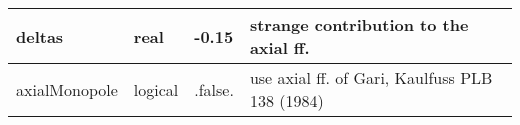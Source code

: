 \documentclass{article}
\begin{document}
\begin{longtable}{llll}
\midrule
deltas & \begin{minipage}[t]{2cm}real\end{minipage} & \begin{minipage}[t]{2cm}-0.15\end{minipage} & \begin{minipage}[t]{12cm}strange contribution to the axial ff.\end{minipage}\\*
\midrule
axialMonopole & \begin{minipage}[t]{2cm}logical\end{minipage} & \begin{minipage}[t]{2cm}.false.\end{minipage} & \begin{minipage}[t]{12cm}use axial ff. of Gari, Kaulfuss PLB 138 (1984)\end{minipage}\\*
\bottomrule
\end{longtable}
{ }



\end{document}
